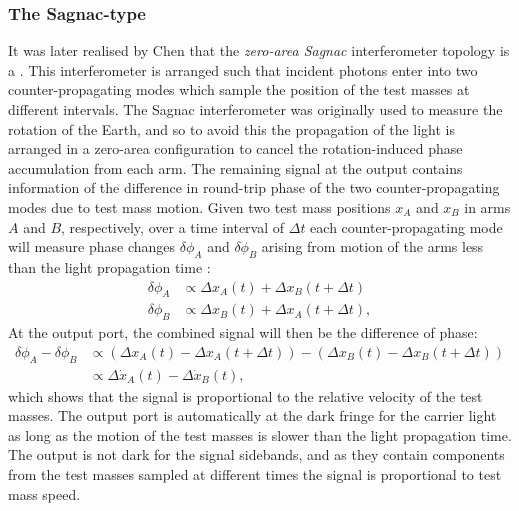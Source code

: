 \subsubsection{The Sagnac-type \SM{}}
It was later realised by Chen that the \emph{zero-area Sagnac} interferometer topology is a \SM{} \cite{Chen2003}. This interferometer is arranged such that incident photons enter into two counter-propagating modes which sample the position of the test masses at different intervals. The Sagnac interferometer was originally used to measure the rotation of the Earth, and so to avoid this the propagation of the light is arranged in a zero-area configuration to cancel the rotation-induced phase accumulation from each arm. The remaining signal at the output contains information of the difference in round-trip phase of the two counter-propagating modes due to test mass motion. Given two test mass positions $x_{A}$ and $x_{B}$ in arms $A$ and $B$, respectively, over a time interval of $\Delta t$ each counter-propagating mode will measure phase changes $\delta \phi_{A}$ and $\delta \phi_{B}$ arising from motion of the arms less than the light propagation time \cite{Chen2003}:
\begin{align}
  \delta \phi_{A} &\propto \Delta x_{A} \left( t \right) + \Delta x_{B} \left( t + \Delta t \right) \\
  \delta \phi_{B} &\propto \Delta x_{B} \left( t \right) + \Delta x_{A} \left( t + \Delta t \right),
\end{align}
At the output port, the combined signal will then be the difference of phase:
\begin{equation}
  \begin{split}
    \delta \phi_{A} - \delta \phi_{B} &\propto \left( \Delta x_{A} \left( t \right) - \Delta x_{A} \left( t + \Delta t \right) \right) - \left( \Delta x_{B} \left( t \right) - \Delta x_{B} \left( t + \Delta t \right) \right) \\
                                      &\propto \Delta \dot{x}_{A} \left( t \right) - \Delta \dot{x}_{B} \left( t \right),
  \end{split}
\end{equation}
which shows that the signal is proportional to the relative velocity of the test masses. The output port is automatically at the dark fringe for the carrier light as long as the motion of the test masses is slower than the light propagation time. The output is not dark for the signal sidebands, and as they contain components from the test masses sampled at different times the signal is proportional to test mass speed.

